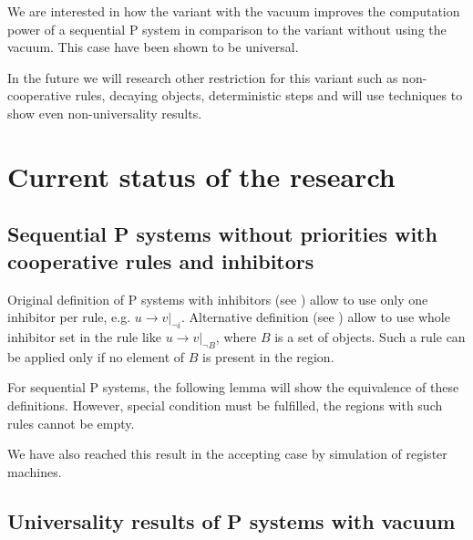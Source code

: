 We are interested in how the variant with the vacuum improves the computation power of a sequential P system in comparison to the variant without using the vacuum. This case have been shown to be universal.

In the future we will research other restriction for this variant such as non-cooperative rules, decaying objects, deterministic steps and will use techniques to show even non-universality results.



\chapter{Current status of the research} %
\label{cha:current_status_of_the_research}

\section{Sequential P systems without priorities with cooperative rules and inhibitors} %
\label{sec:sequential_p_systems_without_priorities_with_cooperative_rules_and_inhibitors}

Original definition of P systems with inhibitors (see \cite{Ionescu:jucs_10_5:on_p_systems_with}) allow to use only one inhibitor per rule, e.g. $u\rightarrow v|_{\neg i}$. Alternative definition (see \cite{Agrigoroaiei:2010:Dissolution}) allow to use whole inhibitor set in the rule like $u\rightarrow v|_{\neg B}$, where $B$ is a set of objects. Such a rule can be applied only if no element of $B$ is present in the region.

For sequential P systems, the following lemma will show the equivalence of these definitions. However, special condition must be fulfilled, the regions with such rules cannot be empty.



We have also reached this result in the accepting case by simulation of register machines.




\section{Universality results of P systems with vacuum} %
\label{sec:universality_results_of_p_systems_with_vacuum}






